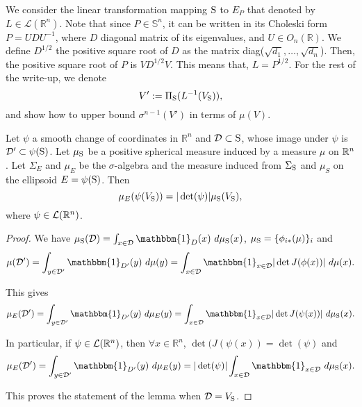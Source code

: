 We consider the linear transformation mapping $\text{S}$ to $E_P$ that denoted by $L \in \mathcal{L}(\mathbb{R}^n)$. Note that since $P \in \mathbb{S}^n$, it can be written in its Choleski form $P = U D U^{-1}$, where 
$D$ diagonal matrix of its eigenvalues, and $U \in O_n(\mathbb{R})$. We define $D^{1/2}$ the positive square root of $D$ as the matrix diag($\sqrt{d_1},\dots, \sqrt{d_n}$). Then, the positive square root of $P$ is $V D^{1/2} V$. This means that, $L = P^{1/2}$. For the rest of the write-up, we denote $$V':=\Pi_{\text{S}}(L^{-1}(V_{\text{S}})),$$ and show how to upper bound $\sigma^{n-1}(V')$ in terms of $\mu(V)$.

\begin{lemma} 
Let $\psi$ a smooth change of coordinates in $\mathbb{R}^n$ and $\mathcal{D} \subset \text{S}$, whose image under $\psi$ is $\mathcal{D}' \subset \psi(\text{S})$. Let $\mu_{\text{S}}$ be a positive spherical measure induced by a measure $\mu$ on $\mathbb{R}^n$. Let $\Sigma_{E}$ and $\mu_{E}$ be the $\sigma$-algebra and the measure induced from $\Sigma_{\text{S}}$ and $\mu_S$ on the ellipsoid $E = \psi(\text{S})$. Then
\begin{equation}
\mu_{E}(\psi(V_{\text{S}})) = |\det(\psi)| \mu_{\text{S}}(V_{\text{S}}),
\end{equation}
where $\psi \in \mathcal{L}(\mathbb{R}^n)$.
\end{lemma}

\begin{proof}
We have $\mu_{\sphere} (\mathcal{D}) = \int_{x \in \mathcal{D}} \mathbbm{1}_{D}(x) \ d \mu_{\sphere}(x)$,  $\mu_{\text{S}} = \{ \phi_{i*}(\mu) \}_{i}$ and
$$\mu (\mathcal{D}') = \int_{y \in \mathcal{D}'} \mathbbm{1}_{D'}(y) \  d \mu(y) = \int_{x \in \mathcal{D}} \mathbbm{1}_{x \in \mathcal{D}}   |\det J(\phi(x))| \  d \mu(x).$$

This gives
$$\mu_{E} (\mathcal{D}') = \int_{y \in \mathcal{D}'} \mathbbm{1}_{D'}(y) \  d \mu_{E}(y) = \int_{x \in \mathcal{D}} \mathbbm{1}_{x \in \mathcal{D}} |\det J(\psi(x))| \  d \mu_{\sphere}(x).$$

In particular, if $\psi \in \mathcal{L}(\mathbb{R}^n)$, then $\forall x \in \mathbb{R}^n$, $\det(J(\psi(x)) = \det(\psi)$ and
$$\mu_{E}(\mathcal{D}') = \int_{y \in \mathcal{D}'} \mathbbm{1}_{D'}(y) \  d \mu_{E}(y) = |\det(\psi)| \int_{x \in \mathcal{D}} \mathbbm{1}_{x \in \mathcal{D}} \ d \mu_{\sphere}(x).$$

This proves the statement of the lemma when $\mathcal{D} = V_{\text{S}}$.
\end{proof}


